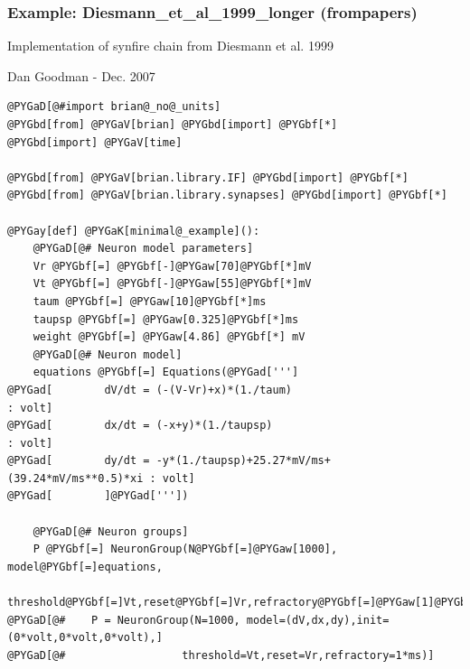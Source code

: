\documentclass[letterpaper,10pt,english]{manual}
\begin{document}
\resetcurrentobjects
\hypertarget{--doc-examples-frompapers_Diesmann_et_al_1999_longer}{}

\hypertarget{index-43}{}\subsubsection{Example: Diesmann\_et\_al\_1999\_longer (frompapers)}

Implementation of synfire chain from Diesmann et al. 1999

Dan Goodman - Dec. 2007

\begin{Verbatim}[commandchars=@\[\]]
@PYGaD[@#import brian@_no@_units]
@PYGbd[from] @PYGaV[brian] @PYGbd[import] @PYGbf[*]
@PYGbd[import] @PYGaV[time]

@PYGbd[from] @PYGaV[brian.library.IF] @PYGbd[import] @PYGbf[*]
@PYGbd[from] @PYGaV[brian.library.synapses] @PYGbd[import] @PYGbf[*]

@PYGay[def] @PYGaK[minimal@_example]():
    @PYGaD[@# Neuron model parameters]
    Vr @PYGbf[=] @PYGbf[-]@PYGaw[70]@PYGbf[*]mV
    Vt @PYGbf[=] @PYGbf[-]@PYGaw[55]@PYGbf[*]mV
    taum @PYGbf[=] @PYGaw[10]@PYGbf[*]ms
    taupsp @PYGbf[=] @PYGaw[0.325]@PYGbf[*]ms
    weight @PYGbf[=] @PYGaw[4.86] @PYGbf[*] mV
    @PYGaD[@# Neuron model]
    equations @PYGbf[=] Equations(@PYGad[''']
@PYGad[        dV/dt = (-(V-Vr)+x)*(1./taum)                            : volt]
@PYGad[        dx/dt = (-x+y)*(1./taupsp)                               : volt]
@PYGad[        dy/dt = -y*(1./taupsp)+25.27*mV/ms+(39.24*mV/ms**0.5)*xi : volt]
@PYGad[        ]@PYGad['''])

    @PYGaD[@# Neuron groups]
    P @PYGbf[=] NeuronGroup(N@PYGbf[=]@PYGaw[1000], model@PYGbf[=]equations,
                  threshold@PYGbf[=]Vt,reset@PYGbf[=]Vr,refractory@PYGbf[=]@PYGaw[1]@PYGbf[*]ms)
@PYGaD[@#    P = NeuronGroup(N=1000, model=(dV,dx,dy),init=(0*volt,0*volt,0*volt),]
@PYGaD[@#                  threshold=Vt,reset=Vr,refractory=1*ms)]


\end{Verbatim}
\end{document}
